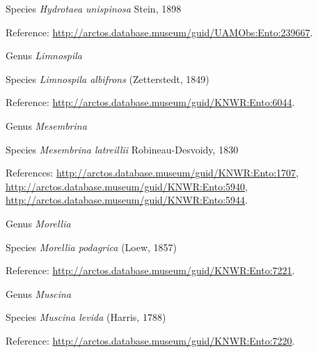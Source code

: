 \documentclass[9pt, article]{memoir}
\begin{document}
\begin{multicols}{2}
\vspace{6pt}\noindent\hspace{36pt}Species \textit{Hydrotaea unispinosa} Stein, 1898


\vspace{6pt}Reference: 
\url{http://arctos.database.museum/guid/UAMObs:Ento:239667}.

\vspace{6pt}\noindent\hspace{30pt}Genus \textit{Limnospila}


\vspace{6pt}\noindent\hspace{36pt}Species \textit{Limnospila albifrons} (Zetterstedt, 1849)


\vspace{6pt}Reference: 
\url{http://arctos.database.museum/guid/KNWR:Ento:6044}.

\vspace{6pt}\noindent\hspace{30pt}Genus \textit{Mesembrina}


\vspace{6pt}\noindent\hspace{36pt}Species \textit{Mesembrina latreillii} Robineau-Desvoidy, 1830


\vspace{6pt}References: 
\url{http://arctos.database.museum/guid/KNWR:Ento:1707}, 
\url{http://arctos.database.museum/guid/KNWR:Ento:5940}, 
\url{http://arctos.database.museum/guid/KNWR:Ento:5944}.

\vspace{6pt}\noindent\hspace{30pt}Genus \textit{Morellia}


\vspace{6pt}\noindent\hspace{36pt}Species \textit{Morellia podagrica} (Loew, 1857)


\vspace{6pt}Reference: 
\url{http://arctos.database.museum/guid/KNWR:Ento:7221}.

\vspace{6pt}\noindent\hspace{30pt}Genus \textit{Muscina}


\vspace{6pt}\noindent\hspace{36pt}Species \textit{Muscina levida} (Harris, 1788)


\vspace{6pt}Reference: 
\url{http://arctos.database.museum/guid/KNWR:Ento:7220}.


\end{multicols}
\end{document}
